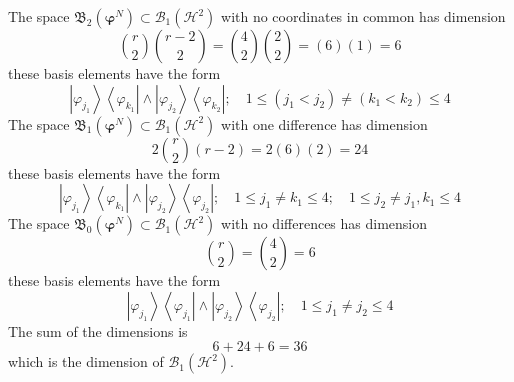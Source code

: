 \documentclass[aps,preprint]{revtex4}%
\begin{document}
The space $\mathfrak{B}_{2}\left(  \mathbf{\varphi}^{N}\right)  \subset
\mathcal{B}_{1}\left(  \mathcal{H}^{2}\right)  $ with no coordinates in common
has dimension
\begin{equation}
\binom{r}{2}\binom{r-2}{2}=\binom{4}{2}\binom{2}{2}=\left(  6\right)  \left(
1\right)  =6
\end{equation}
these basis elements have the form
\begin{equation}
\left\vert \varphi_{j_{1}}\right\rangle \left\langle \varphi_{k_{1}%
}\right\vert \wedge\left\vert \varphi_{j_{2}}\right\rangle \left\langle
\varphi_{k_{2}}\right\vert ;\quad1\leq\left(  j_{1}<j_{2}\right)  \neq\left(
k_{1}<k_{2}\right)  \leq4
\end{equation}
The space $\mathfrak{B}_{1}\left(  \mathbf{\varphi}^{N}\right)  \subset
\mathcal{B}_{1}\left(  \mathcal{H}^{2}\right)  $ with one difference has
dimension
\begin{equation}
2\binom{r}{2}\left(  r-2\right)  =2\left(  6\right)  \left(  2\right)  =24
\end{equation}
these basis elements have the form
\begin{equation}
\left\vert \varphi_{j_{1}}\right\rangle \left\langle \varphi_{k_{1}%
}\right\vert \wedge\left\vert \varphi_{j_{2}}\right\rangle \left\langle
\varphi_{j_{2}}\right\vert ;\quad1\leq j_{1}\neq k_{1}\leq4;\quad1\leq
j_{2}\neq j_{1},k_{1}\leq4
\end{equation}
The space $\mathfrak{B}_{0}\left(  \mathbf{\varphi}^{N}\right)  \subset
\mathcal{B}_{1}\left(  \mathcal{H}^{2}\right)  $ with no differences has
dimension%
\begin{equation}
\binom{r}{2}=\binom{4}{2}=6
\end{equation}
these basis elements have the form
\begin{equation}
\left\vert \varphi_{j_{1}}\right\rangle \left\langle \varphi_{j_{1}%
}\right\vert \wedge\left\vert \varphi_{j_{2}}\right\rangle \left\langle
\varphi_{j_{2}}\right\vert ;\quad1\leq j_{1}\neq j_{2}\leq4
\end{equation}
The sum of the dimensions is
\begin{equation}
6+24+6=36
\end{equation}
which is the dimension of $\mathcal{B}_{1}\left(  \mathcal{H}^{2}\right)  .$
\end{document}
